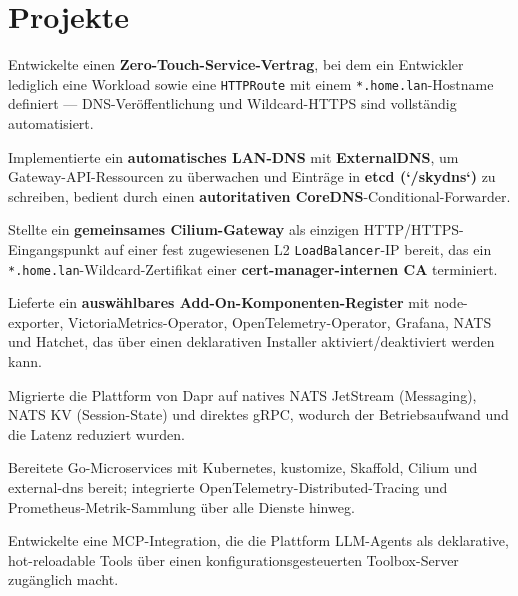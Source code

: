 \documentclass[10pt,a4paper]{resume}
\begin{document}
\vspace{2pt}

\section{Projekte}

\bullets
  \item Entwickelte einen \textbf{Zero-Touch-Service-Vertrag}, bei dem ein Entwickler lediglich eine Workload sowie eine \texttt{HTTPRoute} mit einem \texttt{*.home.lan}-Hostname definiert — DNS-Veröffentlichung und Wildcard-HTTPS sind vollständig automatisiert.
  \item Implementierte ein \textbf{automatisches LAN-DNS} mit \textbf{ExternalDNS}, um Gateway-API-Ressourcen zu überwachen und Einträge in \textbf{etcd (`/skydns`)} zu schreiben, bedient durch einen \textbf{autoritativen CoreDNS}-Conditional-Forwarder.
  \item Stellte ein \textbf{gemeinsames Cilium-Gateway} als einzigen HTTP/HTTPS-Eingangspunkt auf einer fest zugewiesenen L2 \texttt{LoadBalancer}-IP bereit, das ein \texttt{*.home.lan}-Wildcard-Zertifikat einer \textbf{cert-manager-internen CA} terminiert.
  \item Lieferte ein \textbf{auswählbares Add-On-Komponenten-Register} mit node-exporter, VictoriaMetrics-Operator, OpenTelemetry-Operator, Grafana, NATS und Hatchet, das über einen deklarativen Installer aktiviert/deaktiviert werden kann.
\bulletsend
\vspace{1.0pt}
\bullets
  \item Migrierte die Plattform von Dapr auf natives NATS JetStream (Messaging), NATS KV (Session-State) und direktes gRPC, wodurch der Betriebsaufwand und die Latenz reduziert wurden.
  \item Bereitete Go-Microservices mit Kubernetes, kustomize, Skaffold, Cilium und external-dns bereit; integrierte OpenTelemetry-Distributed-Tracing und Prometheus-Metrik-Sammlung über alle Dienste hinweg.
  \item Entwickelte eine MCP-Integration, die die Plattform LLM-Agents als deklarative, hot-reloadable Tools über einen konfigurationsgesteuerten Toolbox-Server zugänglich macht.
\bulletsend
\end{document}
